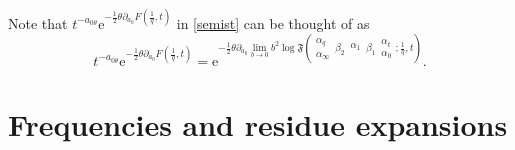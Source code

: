 \documentclass[11pt]{article}
\numberwithin{equation}{section}
\newcommand{\E}{{\mathrm e}}
\begin{document}
Note that $t^{-a_{0\theta} }\E^{-\frac1 2\theta\partial_{a_0}F\left(\frac1 q , t\right)}$ in \eqref{semist} can be thought of as
\begin{equation}
    t^{-a_{0\theta} }\E^{-\frac1 2\theta\partial_{a_0}F\left(\frac1 q , t\right)}=\E^{-\frac1 2\theta\partial_{a_0}\lim\limits_{b\rightarrow 0}b^2\log\mathfrak{F}\left(\begin{matrix}\alpha_q\\ \alpha_{\infty}\end{matrix}\,\beta_2\,\begin{matrix}\alpha_1\\ {}\end{matrix}\,\beta_1\,\begin{matrix}\alpha_t\\ \alpha_{0}\end{matrix};\frac{1}{q},t\right)}.
\end{equation}





\section{Frequencies and residue expansions}\label{app:frequencies}
\end{document}
